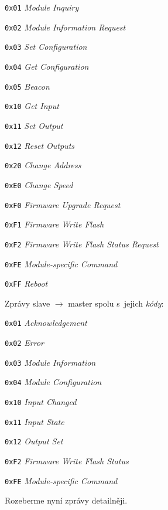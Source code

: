 \begin{compactitem}
\item \texttt{0x01} \textit{Module Inquiry}
\item \texttt{0x02} \textit{Module Information Request}
\item \texttt{0x03} \textit{Set Configuration}
\item \texttt{0x04} \textit{Get Configuration}
\item \texttt{0x05} \textit{Beacon}
\item \texttt{0x10} \textit{Get Input}
\item \texttt{0x11} \textit{Set Output}
\item \texttt{0x12} \textit{Reset Outputs}
\item \texttt{0x20} \textit{Change Address}
\item \texttt{0xE0} \textit{Change Speed}
\item \texttt{0xF0} \textit{Firmware Upgrade Request}
\item \texttt{0xF1} \textit{Firmware Write Flash}
\item \texttt{0xF2} \textit{Firmware Write Flash Status Request}
\item \texttt{0xFE} \textit{Module-specific Command}
\item \texttt{0xFF} \textit{Reboot}

\end{compactitem}

Zprávy slave $\rightarrow$ master spolu s~jejich \textit{kódy}:

\begin{compactitem}
\item \texttt{0x01} \textit{Acknowledgement}
\item \texttt{0x02} \textit{Error}
\item \texttt{0x03} \textit{Module Information}
\item \texttt{0x04} \textit{Module Configuration}
\item \texttt{0x10} \textit{Input Changed}
\item \texttt{0x11} \textit{Input State}
\item \texttt{0x12} \textit{Output Set}
\item \texttt{0xF2} \textit{Firmware Write Flash Status}
\item \texttt{0xFE} \textit{Module-specific Command}
\end{compactitem}

Rozeberme nyní zprávy detailněji.

